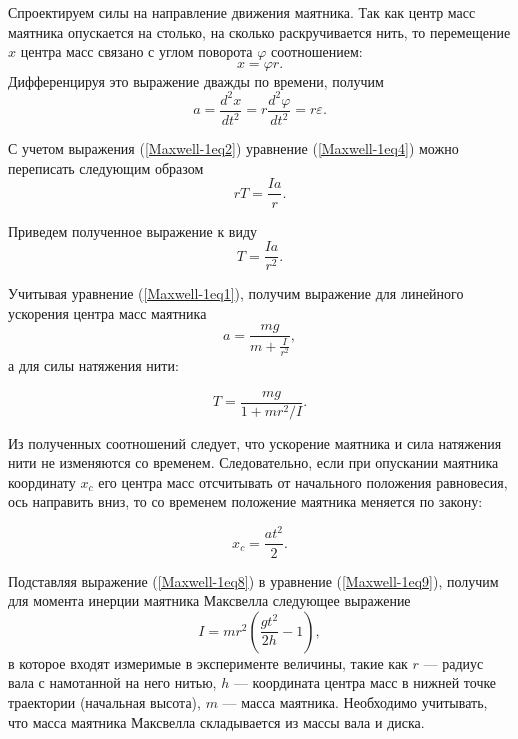 \documentclass[14pt,a4paper,oneside]{extarticle}	%
\begin{document}
	Спроектируем силы на направление движения маятника.  
	Так как центр масс маятника опускается на столько, на сколько раскручивается нить, то перемещение $ x $ центра масс связано с углом поворота $ \varphi $ соотношением:
	\begin{equation}\label{Maxwell-1eq3}
	x = \varphi r.
	\end{equation}
	Дифференцируя это выражение дважды по времени, получим
	\begin{equation}\label{Maxwell-1eq4}
	a = \frac{d^{2} x}{d t^{2}} = r\frac{d^{2} \varphi}{d t^{2}} = r \varepsilon.
	\end{equation}
	
	С учетом выражения (\ref{Maxwell-1eq2}) уравнение (\ref{Maxwell-1eq4}) можно переписать следующим образом 
	\begin{equation}\label{Maxwell-1eq5}
	rT = \frac{Ia}{r}.
	\end{equation}
	
	Приведем полученное выражение к виду
	\begin{equation}\label{Maxwell-1eq6}
	T = \frac{Ia}{r^{2}}.
	\end{equation}
	
	Учитывая уравнение (\ref{Maxwell-1eq1}), получим выражение для линейного ускорения центра масс маятника
	\begin{equation}\label{Maxwell-1eq7}
	a = \frac{mg}{m + \frac{I}{r^{2}}},
	\end{equation}
	а для силы натяжения нити:
	
	\begin{equation}\label{Maxwell-1eq8}
	T = \frac{mg}{1 + mr^2/I}.
	\end{equation}
	
	Из полученных соотношений следует, что ускорение маятника и сила натяжения нити не изменяются со временем. 
	Следовательно, если при опускании маятника координату $ x_c $ его центра масс отсчитывать от начального положения равновесия, ось направить вниз, то со временем положение маятника меняется по закону:
	
	\begin{equation}\label{Maxwell-1eq9}
	x_c = \frac{at^{2}}{2}.
	\end{equation}
	
	Подставляя выражение (\ref{Maxwell-1eq8}) в уравнение (\ref{Maxwell-1eq9}), получим для момента инерции маятника Максвелла следующее выражение
	\begin{equation}\label{Maxwell-1eq10}
	I = mr^{2}\left(\frac{gt^{2}}{2h} - 1 \right),
	\end{equation}
	в которое входят измеримые в эксперименте величины, такие как $ r $ — радиус вала с намотанной на него нитью, $ h $ — координата центра масс в нижней точке траектории (начальная высота), $ m $ — масса маятника.
	Необходимо учитывать, что масса маятника Максвелла складывается из массы вала и диска.
	
	
\end{document}
